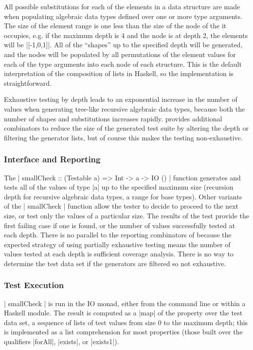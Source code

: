 \noindent
All possible substitutions for each of the elements in a data structure
are made when populating algebraic data types 
defined over one or more type arguments.
The size of the element range is one less than the size of the node of the it occupies,
e.g. if the maximum depth is 4 and the node is at depth 2,
the elements will be |[-1,0,1]|.
All of the ``shapes'' up to the specified depth will be generated,
and the nodes will be populated by all permutations of 
the element values for each of the type arguments into each node of each structure.
This is the default interpretation of the composition of lists in Haskell,
so the implementation is straightforward.

Exhaustive testing by depth leads to an exponential increase in
the number of values when generating tree-like recursive algebraic data types,
because both the number of shapes and substitutions increases rapidly.
\SC provides additional combinators to reduce the size of the generated test suite
by altering the depth or filtering the generator lists,
but of course this makes the testing non-exhaustive.

\subsubsection{Interface and Reporting}

The | smallCheck :: (Testable a) => Int -> a -> IO () | function 
generates and tests all of the values of type |a| up to the specified maximum size
(recursion depth for recursive algebraic data types, a range for base types).
Other variants of the  | smallCheck | function 
allow the tester to decide to proceed to the next size,
or test only the values of a particular size.
The results of the test provide
the first failing case if one is found,
or the number of values successfully tested at each depth.
There is no parallel to the reporting combinators of \QC
because the expected strategy of using partially exhaustive testing
means the number of values tested at each depth is sufficient coverage analysis.
There is no way to determine the test data set
if the generators are filtered so not exhaustive.
%
\subsubsection{Test Execution}
%
| smallCheck | is run in the IO monad,
either from the command line or within a Haskell module.
The result is computed as a |map| of the property over the test data set,
a sequence of lists of test values from size 0 to the maximum depth;
this is implemented as a list comprehension
for most properties (those built over the qualifiers |forAll|, |exists|, or |exists1|).

